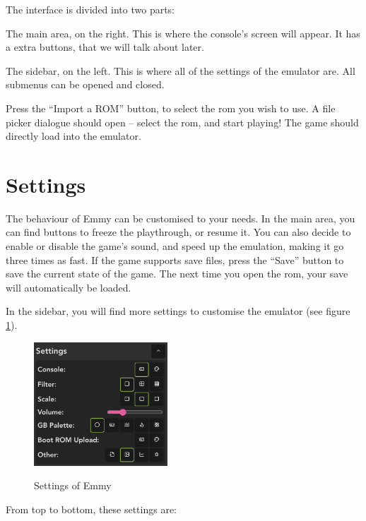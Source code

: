 The interface is divided into two parts:

\begin{compactitem}
	\item The main area, on the right. This is where the console's screen will appear. It has a extra buttons, that we will talk about later.
	\item The sidebar, on the left. This is where all of the settings of the emulator are. All submenus can be opened and closed.
\end{compactitem}


Press the ``Import a ROM'' button, to select the \gls{rom} you wish to use. A file picker dialogue should open -- select the \gls{rom}, and start playing! The game should directly load into the emulator.

\section{Settings}

The behaviour of Emmy can be customised to your needs. In the main area, you can find buttons to freeze the playthrough, or resume it. You can also decide to enable or disable the game's sound, and speed up the emulation, making it go three times as fast. If the game supports save files, press the ``Save'' button to save the current state of the game. The next time you open the \gls{rom}, your save will automatically be loaded.

In the sidebar, you will find more settings to customise the emulator (see figure \ref{fig:emmy-settings}).

\begin{figure}[h]
    \centering
    \includegraphics[width=5cm]{images/emmy-settings}\\
    \caption{Settings of Emmy}
    \label{fig:emmy-settings}
\end{figure}

From top to bottom, these settings are:

